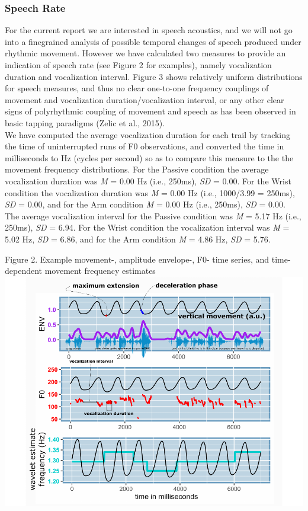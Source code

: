 \documentclass[
  man, noextraspace,floatsintext]{apa6}
\begin{document}
\hypertarget{speech-rate}{%
\subsubsection{Speech Rate}\label{speech-rate}}

For the current report we are interested in speech acoustics, and we will not go into a finegrained analysis of possible temporal changes of speech produced under rhythmic movement. However we have calculated two measures to provide an indication of speech rate (see Figure 2 for examples), namely vocalization duration and vocalization interval. Figure 3 shows relatively uniform distributions for speech measures, and thus no clear one-to-one frequency couplings of movement and vocalization duration/vocalization interval, or any other clear signs of polyrhythmic coupling of movement and speech as has been observed in basic tapping paradigms (Zelic et al., 2015).\\
We have computed the average vocalization duration for each trail by tracking the time of uninterrupted runs of F0 observations, and converted the time in milliseconds to Hz (cycles per second) so as to compare this measure to the the movement frequency distributions. For the Passive condition the average vocalization duration was \emph{M} = 0.00 Hz (i.e., 250ms), \emph{SD} = 0.00. For the Wrist condition the vocalization duration was \emph{M} = 0.00 Hz (i.e., 1000/3.99 = 250ms), \emph{SD} = 0.00, and for the Arm condition \emph{M} = 0.00 Hz (i.e., 250ms), \emph{SD} = 0.00.\\
The average vocalization interval for the Passive condition was \emph{M} = 5.17 Hz (i.e., 250ms), \emph{SD} = 6.94. For the Wrist condition the vocalization interval was \emph{M} = 5.02 Hz, \emph{SD} = 6.86, and for the Arm condition \emph{M} = 4.86 Hz, \emph{SD} = 5.76.

Figure 2. Example movement-, amplitude envelope-, F0- time series, and time-dependent movement frequency estimates
\includegraphics{GS_physics_in_fluid_speech_files/figure-latex/plot_example_time_series-1.pdf}
\end{document}
